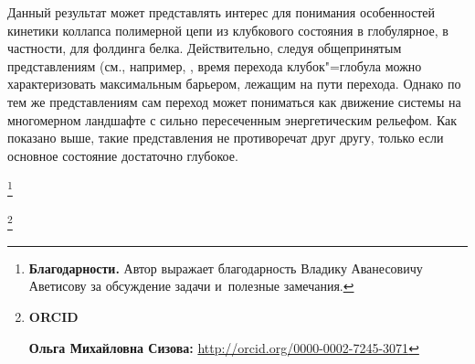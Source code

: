\smallskip

 Данный результат может представлять
интерес для понимания особенностей кинетики коллапса полимерной
цепи из клубкового состояния в глобулярное, в частности, для
фолдинга белка. Действительно, следуя общепринятым представлениям
(см., например, \cite[c.~334]{sizova:bib:GrosHoh}, время перехода
клубок"=глобула можно характеризовать максимальным барьером,
лежащим на пути перехода. Однако по тем же представлениям сам
переход  может пониматься как движение системы на многомерном
ландшафте с сильно пересеченным энергетическим рельефом.  Как
показано выше, такие представления не противоречат друг другу,
только если основное состояние достаточно глубокое.




\thanks{\textbf{Благодарности.} Автор выражает благодарность Владику Аванесовичу Аветисову за обсуждение задачи и~полезные замечания.}


\thanks{{\bf ORCID}

{\bf Ольга Михайловна Сизова:} \url{http://orcid.org/0000-0002-7245-3071}

}
%


\RusRef

